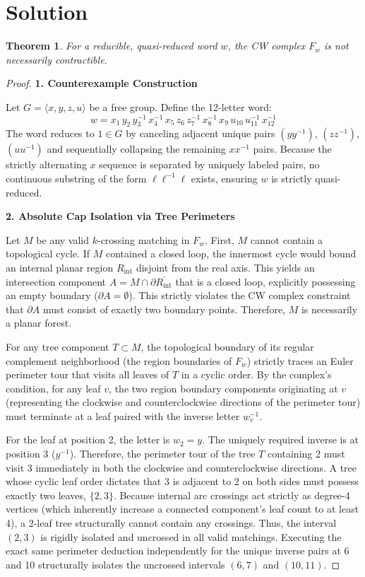 \documentclass[12pt]{article}
\newtheorem{theorem}{Theorem}
\begin{document}
\section*{Solution}

\begin{theorem}
For a reducible, quasi-reduced word $w$, the CW complex $F_w$ is not necessarily contractible.
\end{theorem}

\begin{proof}
\textbf{1. Counterexample Construction}

Let $G = \langle x, y, z, u \rangle$ be a free group. Define the 12-letter word:
\[
w = x_1\, y_2\, y_3^{-1}\, x_4^{-1}\, x_5\, z_6\, z_7^{-1}\, x_8^{-1}\, x_9\, u_{10}\, u_{11}^{-1}\, x_{12}^{-1}
\]
The word reduces to $1 \in G$ by canceling adjacent unique pairs $(y y^{-1})$, $(z z^{-1})$, $(u u^{-1})$ and sequentially collapsing the remaining $x x^{-1}$ pairs. Because the strictly alternating $x$ sequence is separated by uniquely labeled pairs, no continuous substring of the form $\ell \ell^{-1} \ell$ exists, ensuring $w$ is strictly quasi-reduced.

\vspace{1em}
\noindent\textbf{2. Absolute Cap Isolation via Tree Perimeters}

Let $M$ be any valid $k$-crossing matching in $F_w$. First, $M$ cannot contain a topological cycle. If $M$ contained a closed loop, the innermost cycle would bound an internal planar region $R_{\text{int}}$ disjoint from the real axis. This yields an intersection component $A = M \cap \partial \overline{R_{\text{int}}}$ that is a closed loop, explicitly possessing an empty boundary ($\partial A = \emptyset$). This strictly violates the CW complex constraint that $\partial A$ must consist of exactly two boundary points. Therefore, $M$ is necessarily a planar forest.

For any tree component $T \subset M$, the topological boundary of its regular complement neighborhood (the region boundaries of $F_w$) strictly traces an Euler perimeter tour that visits all leaves of $T$ in a cyclic order. By the complex's condition, for any leaf $v$, the two region boundary components originating at $v$ (representing the clockwise and counterclockwise directions of the perimeter tour) must terminate at a leaf paired with the inverse letter $w_v^{-1}$.

For the leaf at position 2, the letter is $w_2 = y$. The uniquely required inverse is at position 3 ($y^{-1}$). Therefore, the perimeter tour of the tree $T$ containing 2 must visit 3 immediately in both the clockwise and counterclockwise directions. A tree whose cyclic leaf order dictates that 3 is adjacent to 2 on both sides must possess exactly two leaves, $\{2,3\}$. Because internal arc crossings act strictly as degree-4 vertices (which inherently increase a connected component's leaf count to at least 4), a 2-leaf tree structurally cannot contain any crossings. Thus, the interval $(2,3)$ is rigidly isolated and uncrossed in all valid matchings. Executing the exact same perimeter deduction independently for the unique inverse pairs at 6 and 10 structurally isolates the uncrossed intervals $(6,7)$ and $(10,11)$.


\end{proof}
\end{document}
